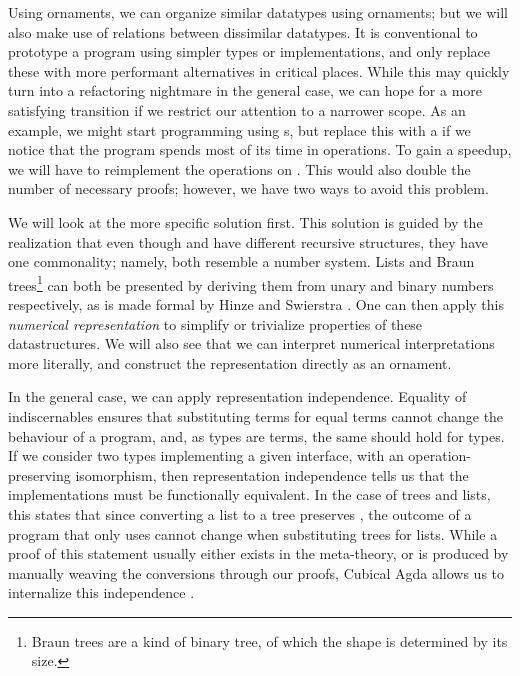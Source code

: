 Using ornaments, we can organize similar datatypes using ornaments; but we will also make use of relations between dissimilar datatypes. It is conventional to prototype a program using simpler types or implementations, and only replace these with more performant alternatives in critical places. %
While this may quickly turn into a refactoring nightmare in the general case, we can hope for a more satisfying transition if we restrict our attention to a narrower scope. As an example, we might start programming using s, but replace this with a  if we notice that the program spends most of its time in  operations. To gain a speedup, we will have to reimplement the operations on . This would also double the number of necessary proofs; however, we have two ways to avoid this problem. 

We will look at the more specific solution first. This solution is guided by the realization that even though  and  have different recursive structures, they have one commonality; namely, both resemble a number system. Lists and Braun trees\footnote{Braun trees are a kind of binary tree, of which the shape is determined by its size.} can both be presented by deriving them from unary and binary numbers respectively, as is made formal by Hinze and Swierstra \cite{calcdata}. One can then apply this \textit{numerical representation} \cite{purelyfunctional} to simplify or trivialize properties of these datastructures. We will also see that we can interpret numerical interpretations more literally, and construct the representation directly as an ornament.

In the general case, we can apply representation independence. Equality of indiscernables ensures that substituting terms for equal terms cannot change the behaviour of a program, and, as types are terms, the same should hold for types. If we consider two types implementing a given interface, with an operation-preserving isomorphism, then representation independence tells us that the implementations must be functionally equivalent. In the case of trees and lists, this states that since converting a list to a tree preserves , the outcome of a program that only uses  cannot change when substituting trees for lists. While a proof of this statement usually either exists in the meta-theory, or is produced by manually weaving the conversions through our proofs, Cubical Agda allows us to internalize this independence \cite{iri}.  

